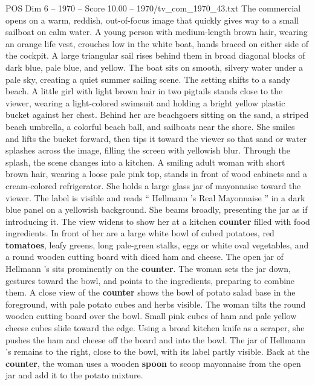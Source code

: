 \begin{textsample}{POS Dim 6 – 1970 – Score 10.00 – 1970/tv\_com\_1970\_43.txt}  \label{ex:f6_pos_044}
The commercial opens on a warm, reddish, out-of-focus image that quickly gives way to a small sailboat on calm water.
A young person with medium-length brown hair, wearing an orange life vest, crouches low in the white boat, hands braced on either side of the cockpit.
A large triangular sail rises behind them in broad diagonal blocks of dark blue, pale blue, and yellow.
The boat sits on smooth, silvery water under a pale sky, creating a quiet summer sailing scene.
The setting shifts to a sandy beach.
A little girl with light brown hair in two pigtails stands close to the viewer, wearing a light-colored swimsuit and holding a bright yellow plastic bucket against her chest.
Behind her are beachgoers sitting on the sand, a striped beach umbrella, a colorful beach ball, and sailboats near the shore.
She smiles and lifts the bucket forward, then tips it toward the viewer so that sand or water splashes across the image, filling the screen with yellowish blur.
Through the splash, the scene changes into a kitchen.
A smiling adult woman with short brown hair, wearing a loose pale pink top, stands in front of wood cabinets and a cream-colored refrigerator.
She holds a large glass jar of mayonnaise toward the viewer.
The label is visible and reads “ Hellmann ’s Real Mayonnaise ” in a dark blue panel on a yellowish background.
She beams broadly, presenting the jar as if introducing it.
The view widens to show her at a kitchen \textbf{counter} filled with food ingredients.
In front of her are a large white bowl of cubed potatoes, red \textbf{tomatoes}, leafy greens, long pale-green stalks, eggs or white oval vegetables, and a round wooden cutting board with diced ham and cheese.
The open jar of Hellmann ’s sits prominently on the \textbf{counter}.
The woman sets the jar down, gestures toward the bowl, and points to the ingredients, preparing to combine them.
A close view of the \textbf{counter} shows the bowl of potato salad base in the foreground, with pale potato cubes and herbs visible.
The woman tilts the round wooden cutting board over the bowl.
Small pink cubes of ham and pale yellow cheese cubes slide toward the edge.
Using a broad kitchen knife as a scraper, she pushes the ham and cheese off the board and into the bowl.
The jar of Hellmann ’s remains to the right, close to the bowl, with its label partly visible.
Back at the \textbf{counter}, the woman uses a wooden \textbf{spoon} to scoop mayonnaise from the open jar and add it to the potato mixture.

\end{textsample}

